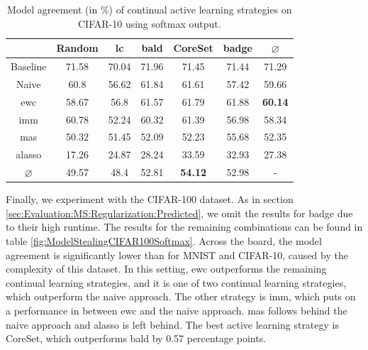 \begin{table}[h]
    \centering
    \begin{tabular}{ c | c c c c c | c } 
         & Random & \gls{lc} & \gls{bald} & CoreSet & \gls{badge} & $\varnothing$\\ 
        \hline 
        Baseline & 71.58 & 70.04 & 71.96 & 71.45 & 71.44 & 71.29\\
        \hline
        Naive & 60.8 & 56.62 & 61.84 & 61.61 & 57.42 & 59.66 \\
        \gls{ewc} & 58.67 & 56.8 & 61.57 & 61.79 & 61.88 & \textbf{60.14}\\
        \gls{imm} & 60.78 & 52.24 & 60.32 & 61.39 & 56.98 & 58.34 \\
        \gls{mas} & 50.32 & 51.45 & 52.09 & 52.23 & 55.68 & 52.35\\
        \gls{alasso} & 17.26 & 24.87 & 28.24 & 33.59 & 32.93 & 27.38\\
        \hline
        $\varnothing$ & 49.57 & 48.4 & 52.81 & \textbf{54.12} & 52.98 & -\\
    \end{tabular}
    \caption{Model agreement (in \%) of continual active learning strategies on CIFAR-10 using softmax output.}
    \label{fig:ModelStealingCIFAR10Softmax}
\end{table}


Finally, we experiment with the CIFAR-100 dataset. As in section \ref{sec:Evaluation:MS:Regularization:Predicted}, we omit the results for \gls{badge} due to their high runtime.
The results for the remaining combinations can be found in table \ref{fig:ModelStealingCIFAR100Softmax}. Across the board, the model agreement is
significantly lower than for MNIST and CIFAR-10, caused by the complexity of this dataset. In this setting,
\gls{ewc} outperforms the remaining continual learning strategies, and it is one of two continual learning strategies, which outperform the naive approach.
The other strategy is \gls{imm}, which puts on a performance in between \gls{ewc} and the naive approach. \gls{mas} follows behind the naive approach
and \gls{alasso} is left behind. The best active learning strategy is CoreSet, which outperforms \gls{bald} by 0.57 percentage points.\par

